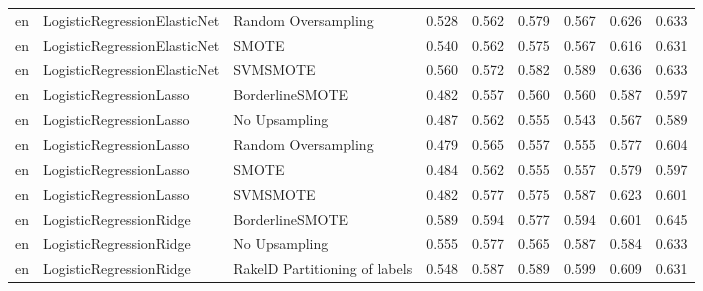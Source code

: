 \begin{tabular}{lllllllll}
      en &    LogisticRegressionElasticNet &           Random Oversampling & 0.528 &                     0.562 &                 0.579 &                  0.567 &                                   0.626 &     0.633 \\
      en &    LogisticRegressionElasticNet &                         SMOTE & 0.540 &                     0.562 &                 0.575 &                  0.567 &                                   0.616 &     0.631 \\
      en &    LogisticRegressionElasticNet &                      SVMSMOTE & 0.560 &                     0.572 &                 0.582 &                  0.589 &                                   0.636 &     0.633 \\
      en &         LogisticRegressionLasso &               BorderlineSMOTE & 0.482 &                     0.557 &                 0.560 &                  0.560 &                                   0.587 &     0.597 \\
      en &         LogisticRegressionLasso &                 No Upsampling & 0.487 &                     0.562 &                 0.555 &                  0.543 &                                   0.567 &     0.589 \\
      en &         LogisticRegressionLasso &           Random Oversampling & 0.479 &                     0.565 &                 0.557 &                  0.555 &                                   0.577 &     0.604 \\
      en &         LogisticRegressionLasso &                         SMOTE & 0.484 &                     0.562 &                 0.555 &                  0.557 &                                   0.579 &     0.597 \\
      en &         LogisticRegressionLasso &                      SVMSMOTE & 0.482 &                     0.577 &                 0.575 &                  0.587 &                                   0.623 &     0.601 \\
      en &         LogisticRegressionRidge &               BorderlineSMOTE & 0.589 &                     0.594 &                 0.577 &                  0.594 &                                   0.601 &     0.645 \\
      en &         LogisticRegressionRidge &                 No Upsampling & 0.555 &                     0.577 &                 0.565 &                  0.587 &                                   0.584 &     0.633 \\
      en &         LogisticRegressionRidge & RakelD Partitioning of labels & 0.548 &                     0.587 &                 0.589 &                  0.599 &                                   0.609 &     0.631 \\

\end{tabular}
